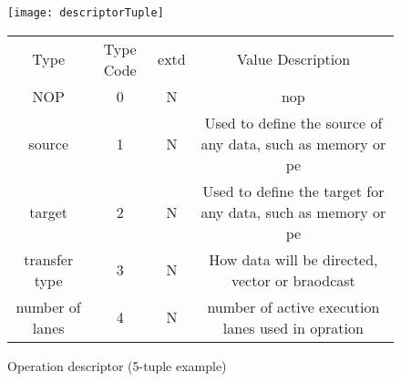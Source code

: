 \iffalse
\begin{figure}[!t]
\centering
\captionsetup{justification=centering}
\captionsetup{width=.9\linewidth}
\centerline{
\mbox{\texttt{[image: descriptorTuple]}}
}
\caption{Operation descriptor (5-tuple example)}
\label{fig:descriptorTuple}
\end{figure}
\fi


\begin{figure}[!t]
  \centering
  \captionsetup{justification=centering}

  \begin{minipage}{1\textwidth}
    \centering
    \begin{minipage}{0.85\textwidth}
      \centering
      \captionsetup{justification=centering}
      \captionsetup{width=.9\linewidth}
      \centerline{
      \mbox{\texttt{[image: descriptorTuple]}}
      }
      \vspace{-2mm}
      \caption{Operation descriptor (5-tuple example)}
      \label{fig:descriptorTuple}
    \end{minipage}
    \begin{minipage}{0.85\textwidth}
        \vspace{5mm}
        \begin{adjustbox}{width=1\textwidth}
            \footnotesize
            \begin{tabular}{ |c|c|c|c|  }
              \hline
              \rowcolor{gray!50}
              \multicolumn{4}{|c|}{Source} \\
              \hline
              \rowcolor{gray!25}
              Type & Type Code & extd &  Value Description  \\
              \hline
              NOP                              &    0   &  N&  \acl{nop} \\
              source                           &    1   &  N&  Used to define the source of any data, such as memory or \ac{pe}  \\
              target                           &    2   &  N&  Used to define the target for any data, such as memory or \ac{pe}  \\
              transfer type                    &    3   &  N&  How data will be directed, vector or braodcast                    \\
              number of lanes                  &    4   &  N&  number of active execution lanes used in opration \\

\end{tabular}
\end{adjustbox}
\end{minipage}
\end{minipage}
\end{figure}
